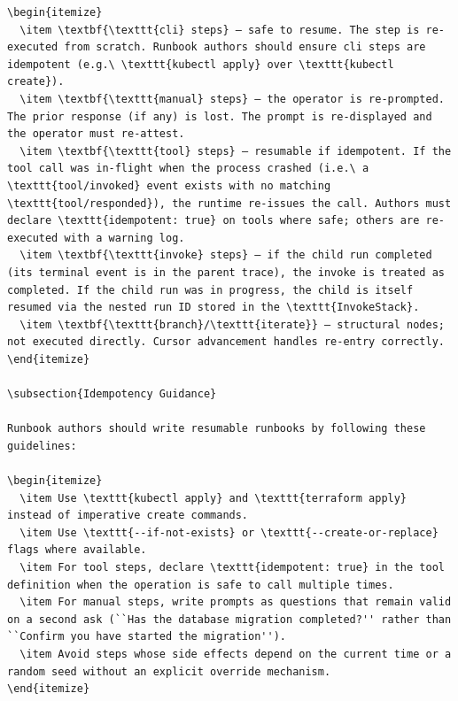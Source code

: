 \begin{verbatim}
\begin{itemize}
  \item \textbf{\texttt{cli} steps} — safe to resume. The step is re-executed from scratch. Runbook authors should ensure cli steps are idempotent (e.g.\ \texttt{kubectl apply} over \texttt{kubectl create}).
  \item \textbf{\texttt{manual} steps} — the operator is re-prompted. The prior response (if any) is lost. The prompt is re-displayed and the operator must re-attest.
  \item \textbf{\texttt{tool} steps} — resumable if idempotent. If the tool call was in-flight when the process crashed (i.e.\ a \texttt{tool/invoked} event exists with no matching \texttt{tool/responded}), the runtime re-issues the call. Authors must declare \texttt{idempotent: true} on tools where safe; others are re-executed with a warning log.
  \item \textbf{\texttt{invoke} steps} — if the child run completed (its terminal event is in the parent trace), the invoke is treated as completed. If the child run was in progress, the child is itself resumed via the nested run ID stored in the \texttt{InvokeStack}.
  \item \textbf{\texttt{branch}/\texttt{iterate}} — structural nodes; not executed directly. Cursor advancement handles re-entry correctly.
\end{itemize}

\subsection{Idempotency Guidance}

Runbook authors should write resumable runbooks by following these guidelines:

\begin{itemize}
  \item Use \texttt{kubectl apply} and \texttt{terraform apply} instead of imperative create commands.
  \item Use \texttt{--if-not-exists} or \texttt{--create-or-replace} flags where available.
  \item For tool steps, declare \texttt{idempotent: true} in the tool definition when the operation is safe to call multiple times.
  \item For manual steps, write prompts as questions that remain valid on a second ask (``Has the database migration completed?'' rather than ``Confirm you have started the migration'').
  \item Avoid steps whose side effects depend on the current time or a random seed without an explicit override mechanism.
\end{itemize}


\end{verbatim}

